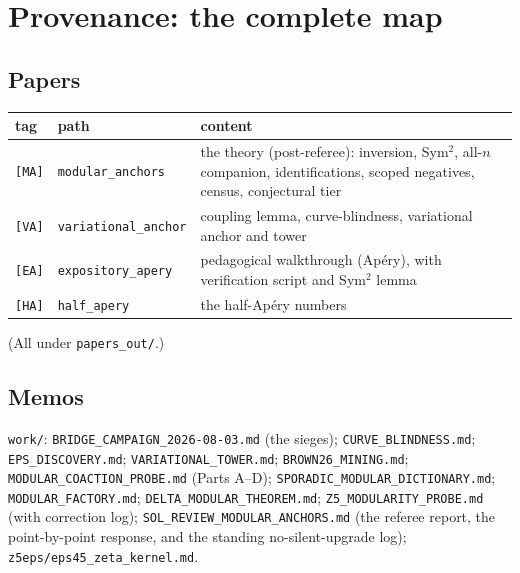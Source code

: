 \documentclass[11pt,reqno]{amsart}
\theoremstyle{plain}
\theoremstyle{definition}
\theoremstyle{remark}
\newcommand{\MA}{\texttt{[MA]}}
\newcommand{\VA}{\texttt{[VA]}}
\newcommand{\EA}{\texttt{[EA]}}
\newcommand{\HA}{\texttt{[HA]}}
\begin{document}
\section{Provenance: the complete map}\label{sec:provenance}

\subsection*{Papers}
\begin{center}\small
\begin{tabular}{@{}llp{5.6cm}@{}}
\toprule
tag & path & content \\
\midrule
\MA & \texttt{modular\_anchors} & the theory (post-referee): inversion,
Sym$^2$, all-$n$ companion, identifications, scoped negatives, census,
conjectural tier \\
\VA & \texttt{variational\_anchor} & coupling lemma, curve-blindness,
variational anchor and tower \\
\EA & \texttt{expository\_apery} & pedagogical walkthrough (Ap\'ery), with
verification script and Sym$^2$ lemma \\
\HA & \texttt{half\_apery} & the half-Ap\'ery numbers \\
\bottomrule
\end{tabular}
\end{center}
(All under \texttt{papers\_out/}.)

\subsection*{Memos} \texttt{work/}: \texttt{BRIDGE\_CAMPAIGN\_2026-08-03.md}
(the sieges); \texttt{CURVE\_BLINDNESS.md}; \texttt{EPS\_DISCOVERY.md};
\texttt{VARIATIONAL\_TOWER.md}; \texttt{BROWN26\_MINING.md};
\texttt{MODULAR\_COACTION\_PROBE.md} (Parts A--D);
\texttt{SPORADIC\_MODULAR\_DICTIONARY.md}; \texttt{MODULAR\_FACTORY.md};
\texttt{DELTA\_MODULAR\_THEOREM.md}; \texttt{Z5\_MODULARITY\_PROBE.md}
(with correction log); \texttt{SOL\_REVIEW\_MODULAR\_ANCHORS.md} (the
referee report, the point-by-point response, and the standing
no-silent-upgrade log); \texttt{z5eps/eps45\_zeta\_kernel.md}.
\end{document}
